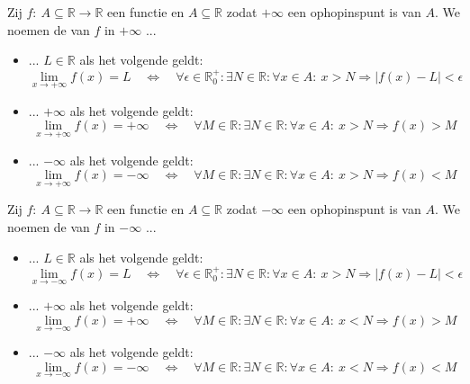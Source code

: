 \documentclass[main.tex]{subfiles}
\begin{document}
\begin{de}
  Zij $f:\ A \subseteq \mathbb{R} \rightarrow \mathbb{R}$ een functie en $A \subseteq \mathbb{R}$ zodat $+\infty$ een ophopinspunt is van $A$.
  We noemen de  van $f$ in $+\infty$ ...
  \begin{itemize}
  \item ... $L\in \mathbb{R}$ als het volgende geldt:
    \[
    \lim_{x\rightarrow +\infty}f(x) = L \quad\Leftrightarrow\quad
    \forall \epsilon \in \mathbb{R}_{0}^{+}: \exists N \in \mathbb{R}: \forall x\in A:\ x > N \Rightarrow |f(x) - L| < \epsilon
    \]
  \item ... $+\infty$ als het volgende geldt:
    \[
    \lim_{x\rightarrow +\infty}f(x) = +\infty\quad\Leftrightarrow\quad
    \forall M \in \mathbb{R}: \exists N \in \mathbb{R}: \forall x\in A:\ x > N \Rightarrow f(x) > M
    \]
  \item ... $-\infty$ als het volgende geldt:
    \[
    \lim_{x\rightarrow +\infty}f(x) = -\infty\quad\Leftrightarrow\quad
    \forall M \in \mathbb{R}: \exists N \in \mathbb{R}: \forall x\in A:\ x > N \Rightarrow f(x) < M
    \]
  \end{itemize}
\end{de}

\begin{de}
  Zij $f:\ A \subseteq \mathbb{R} \rightarrow \mathbb{R}$ een functie en $A \subseteq \mathbb{R}$ zodat $-\infty$ een ophopinspunt is van $A$.
  We noemen de  van $f$ in $-\infty$ ...
  \begin{itemize}
  \item ... $L\in \mathbb{R}$ als het volgende geldt:
    \[
    \lim_{x\rightarrow -\infty}f(x) = L \quad\Leftrightarrow\quad
    \forall \epsilon \in \mathbb{R}_{0}^{+}: \exists N \in \mathbb{R}: \forall x\in A:\ x > N \Rightarrow |f(x) - L| < \epsilon
    \]
  \item ... $+\infty$ als het volgende geldt:
    \[
    \lim_{x\rightarrow -\infty}f(x) = +\infty\quad\Leftrightarrow\quad
    \forall M \in \mathbb{R}: \exists N \in \mathbb{R}: \forall x\in A:\ x < N \Rightarrow f(x) > M
    \]
  \item ... $-\infty$ als het volgende geldt:
    \[
    \lim_{x\rightarrow -\infty}f(x) = -\infty\quad\Leftrightarrow\quad
    \forall M \in \mathbb{R}: \exists N \in \mathbb{R}: \forall x\in A:\ x < N \Rightarrow f(x) < M
    \]
  \end{itemize}
\end{de}
\end{document}
